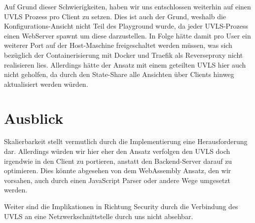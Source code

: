 \documentclass{article}
\begin{document}
Auf Grund dieser Schwierigkeiten, haben wir uns entschlossen weiterhin auf einen UVLS Prozess pro Client zu setzen. 
Dies ist auch der Grund, weshalb die Konfigurations-Ansicht nicht Teil des Playground wurde, da jeder UVLS-Prozess einen WebServer spawnt um diese darzustellen.
In Folge hätte damit pro User ein weiterer Port auf der Host-Maschine freigeschaltet werden müssen, was sich bezüglich der Containerisierung mit Docker und Traefik als Reverseproxy nicht realisieren lies.
Allerdings hätte der Ansatz mit einem geteilten UVLS hier auch nicht geholfen, da durch den State-Share alle Ansichten über Clients hinweg aktualisiert werden würden.

\section{Ausblick}
Skalierbarkeit stellt vermutlich durch die Implementierung eine Herausforderung dar.
Allerdings würden wir hier eher den Ansatz verfolgen den UVLS doch irgendwie in den Client zu portieren, anstatt den Backend-Server darauf zu optimieren.
Dies könnte abgesehen von dem WebAssembly Ansatz, den wir vorsahen, auch durch einen JavaScript Parser oder andere Wege umgesetzt werden.

Weiter sind die Implikationen in Richtung Security durch die Verbindung des UVLS an eine Netzwerkschnittstelle durch uns nicht absehbar.
\end{document}
